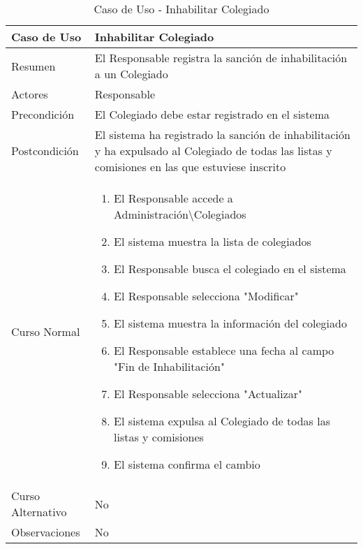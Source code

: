 \begin{table}[!htbp]
  \centering  \addtocounter{casouso}{1}
  \begin{tabular}{|l | p{100mm}|}
    \textbf{Caso de Uso}  & \textbf{Inhabilitar Colegiado} \\ \hline
    Resumen 		 & El Responsable registra la sanción de inhabilitación a un Colegiado \\ \hline
    Actores  		 & Responsable \\ \hline
    Precondición  	 & El Colegiado debe estar registrado en el sistema \\ \hline
    Postcondición  	 & El sistema ha registrado la sanción de inhabilitación y ha expulsado al Colegiado de todas las listas y comisiones en las que estuviese inscrito \\ \hline
    Curso Normal   	 & \begin{enumerate}
	  \item El Responsable accede a Administración\textbackslash Colegiados
	  \item El sistema muestra la lista de colegiados
	  \item El Responsable busca el colegiado en el sistema
	  \item El Responsable selecciona "Modificar"
	  \item El sistema muestra la información del colegiado
	  \item El Responsable establece una fecha al campo "Fin de Inhabilitación"
	  \item El Responsable selecciona "Actualizar"
	  \item El sistema expulsa al Colegiado de todas las listas y comisiones
	  \item El sistema confirma el cambio
    \end{enumerate}  \\ \hline
    Curso Alternativo  & No  \\ \hline
    Observaciones 	 & No \\ \hline
  \end{tabular}
  \caption{Caso de Uso  - Inhabilitar Colegiado}
  \label{tab:curInhabilitar}
\end{table}
\FloatBarrier

